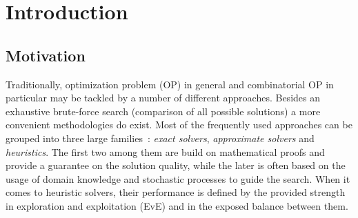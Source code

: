 \chapter{Introduction}\label{intro}

\section{Motivation}
Traditionally, optimization problem (OP) in general and combinatorial OP in particular may be tackled by a number of different approaches. Besides an exhaustive brute-force search (comparison of all possible solutions) a more convenient methodologies do exist. Most of the frequently used approaches can be grouped into three large families~\cite{junger2003combinatorial,biegler2004retrospective,festa2014brief}: \emph{exact solvers}, \emph{approximate solvers} and \emph{heuristics}. The first two among them are build on mathematical proofs and provide a guarantee on the solution quality, while the later is often based on the usage of domain knowledge and stochastic processes to guide the search. When it comes to heuristic solvers, their performance is defined by the provided strength in exploration and exploitation (EvE) and in the exposed balance between them. 

